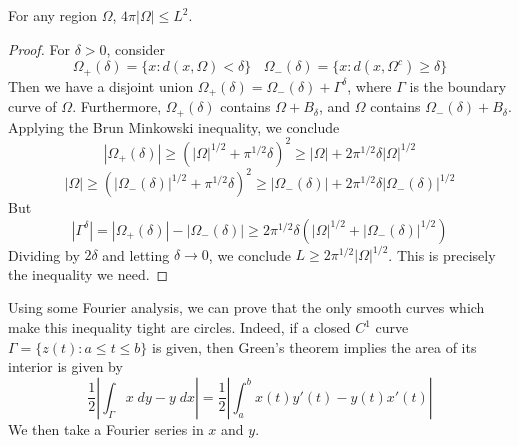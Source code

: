 \begin{theorem}
  For any region $\Omega$, $4 \pi |\Omega| \leq L^2$.
\end{theorem}
\begin{proof}
  For $\delta > 0$, consider
  \[ \Omega_+(\delta) = \{ x: d(x,\Omega) < \delta \}\ \ \ \ \Omega_-(\delta) = \{ x : d(x,\Omega^c) \geq \delta \} \]
  Then we have a disjoint union $\Omega_+(\delta) = \Omega_-(\delta) + \Gamma^\delta$, where $\Gamma$ is the boundary curve of $\Omega$. Furthermore, $\Omega_+(\delta)$ contains $\Omega + B_\delta$, and $\Omega$ contains $\Omega_-(\delta) + B_\delta$. Applying the Brun Minkowski inequality, we conclude
  \[ |\Omega_+(\delta)| \geq (|\Omega|^{1/2} + \pi^{1/2} \delta)^2 \geq |\Omega| + 2 \pi^{1/2} \delta |\Omega|^{1/2} \]
  \[ |\Omega| \geq (|\Omega_-(\delta)|^{1/2} + \pi^{1/2} \delta)^2 \geq |\Omega_-(\delta)| + 2 \pi^{1/2} \delta |\Omega_-(\delta)|^{1/2} \]
  But
  \[ |\Gamma^\delta| = |\Omega_+(\delta)| - |\Omega_-(\delta)| \geq 2 \pi^{1/2} \delta \left( |\Omega|^{1/2} + |\Omega_-(\delta)|^{1/2} \right) \]
  Dividing by $2\delta$ and letting $\delta \to 0$, we conclude $L \geq 2 \pi^{1/2} |\Omega|^{1/2}$. This is precisely the inequality we need.
\end{proof}

Using some Fourier analysis, we can prove that the only smooth curves which make this inequality tight are circles. Indeed, if a closed $C^1$ curve $\Gamma = \{ z(t): a \leq t \leq b \}$ is given, then Green's theorem implies the area of its interior is given by
%
\[ \frac{1}{2} \left| \int_\Gamma x\; dy - y\; dx \right| = \frac{1}{2} \left| \int_a^b x(t) y'(t) - y(t) x'(t) \right| \]
%
We then take a Fourier series in $x$ and $y$.

